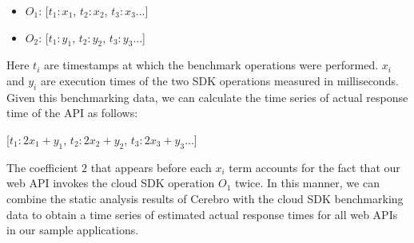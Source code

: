 \begin{itemize}
\item $O_{1}$: [$t_{1}:x_{1}$, $t_{2}:x_{2}$, $t_{3}:x_{3}$...]
\item $O_{2}$: [$t_{1}:y_{1}$, $t_{2}:y_{2}$, $t_{3}:y_{3}$...]
\end{itemize}

Here $t_{i}$ are timestamps at which the benchmark operations were performed. $x_{i}$ and $y_{i}$ are
execution times of the two SDK operations measured in milliseconds. Given this benchmarking data,
we can calculate the time series of actual response time of the API as follows:

[$t_{1}:2x_{1}+y_{1}$, $t_{2}:2x_{2}+y_{2}$, $t_{3}:2x_{3}+y_{3}$...]

The coefficient $2$ that appears before each $x_{i}$ term accounts for the fact that our web API
invokes the cloud SDK operation $O_{1}$ twice. In this manner, we can combine the static analysis
results of Cerebro with the cloud SDK benchmarking data to obtain a time series of estimated
actual response times for all web APIs in our sample applications.


